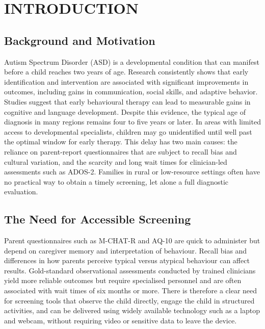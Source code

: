 \documentclass[12pt,a4paper]{report}
\begin{document}
\chapter{INTRODUCTION}
\section{Background and Motivation}
Autism Spectrum Disorder (ASD) is a developmental condition that can manifest before a child reaches two years of age. Research consistently shows that early identification and intervention are associated with significant improvements in outcomes, including gains in communication, social skills, and adaptive behavior. Studies suggest that early behavioural therapy can lead to measurable gains in cognitive and language development. Despite this evidence, the typical age of diagnosis in many regions remains four to five years or later. In areas with limited access to developmental specialists, children may go unidentified until well past the optimal window for early therapy. This delay has two main causes: the reliance on parent-report questionnaires that are subject to recall bias and cultural variation, and the scarcity and long wait times for clinician-led assessments such as ADOS-2. Families in rural or low-resource settings often have no practical way to obtain a timely screening, let alone a full diagnostic evaluation.
\section{The Need for Accessible Screening}
Parent questionnaires such as M-CHAT-R and AQ-10 are quick to administer but depend on caregiver memory and interpretation of behaviour. Recall bias and differences in how parents perceive typical versus atypical behaviour can affect results. Gold-standard observational assessments conducted by trained clinicians yield more reliable outcomes but require specialised personnel and are often associated with wait times of six months or more. There is therefore a clear need for screening tools that observe the child directly, engage the child in structured activities, and can be delivered using widely available technology such as a laptop and webcam, without requiring video or sensitive data to leave the device.
\end{document}
